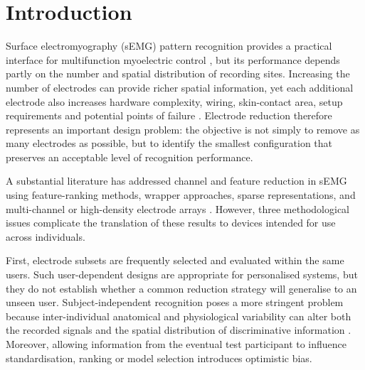 \section{Introduction}
\label{sec:introduction}

Surface electromyography (sEMG) pattern recognition provides a practical interface for multifunction myoelectric control \citep{hudgins1993new,englehart2003robust,scheme2011electromyogram,farina2014extraction}, but its performance depends partly on the number and spatial distribution of recording sites. Increasing the number of electrodes can provide richer spatial information, yet each additional electrode also increases hardware complexity, wiring, skin-contact area, setup requirements and potential points of failure \citep{vujaklija2016new}. Electrode reduction therefore represents an important design problem: the objective is not simply to remove as many electrodes as possible, but to identify the smallest configuration that preserves an acceptable level of recognition performance.

A substantial literature has addressed channel and feature reduction in sEMG using feature-ranking methods, wrapper approaches, sparse representations, and multi-channel or high-density electrode arrays \citep{phinyomark2012feature,liu2014emg,altimemy2013classification,stango2015spatial,qu2021reduce}. However, three methodological issues complicate the translation of these results to devices intended for use across individuals.

First, electrode subsets are frequently selected and evaluated within the same users. Such user-dependent designs are appropriate for personalised systems, but they do not establish whether a common reduction strategy will generalise to an unseen user. Subject-independent recognition poses a more stringent problem because inter-individual anatomical and physiological variability can alter both the recorded signals and the spatial distribution of discriminative information \citep{phinyomark2018emg,cote2019deep}. Moreover, allowing information from the eventual test participant to influence standardisation, ranking or model selection introduces optimistic bias.

